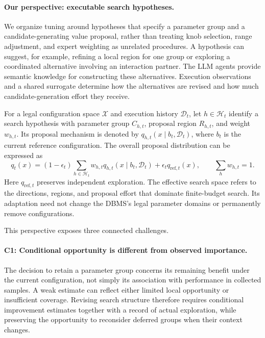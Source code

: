 \paragraph{Our perspective: executable search hypotheses.}
We organize tuning around hypotheses that specify a parameter group and a candidate-generating value proposal, rather than treating knob selection, range adjustment, and expert weighting as unrelated procedures. A hypothesis can suggest, for example, refining a local region for one group or exploring a coordinated alternative involving an interaction partner. The LLM agents provide semantic knowledge for constructing these alternatives. Execution observations and a shared surrogate determine how the alternatives are revised and how much candidate-generation effort they receive.

For a legal configuration space $\mathcal X$ and execution history $\mathcal D_t$, let $h\in\mathcal H_t$ identify a search hypothesis with parameter group $C_{h,t}$, proposal region $R_{h,t}$, and weight $w_{h,t}$. Its proposal mechanism is denoted by $q_{h,t}(x\mid b_t,\mathcal D_t)$, where $b_t$ is the current reference configuration. The overall proposal distribution can be expressed as
\begin{equation}
q_t(x)=(1-\epsilon_t)\sum_{h\in\mathcal H_t}w_{h,t}
q_{h,t}(x\mid b_t,\mathcal D_t)+\epsilon_t q_{\mathrm{ref},t}(x),
\qquad \sum_h w_{h,t}=1.
\end{equation}
Here $q_{\mathrm{ref},t}$ preserves independent exploration. The effective search space refers to the directions, regions, and proposal effort that dominate finite-budget search. Its adaptation need not change the DBMS's legal parameter domains or permanently remove configurations.

This perspective exposes three connected challenges.

\paragraph{C1: Conditional opportunity is different from observed importance.}
The decision to retain a parameter group concerns its remaining benefit under the current configuration, not simply its association with performance in collected samples. A weak estimate can reflect either limited local opportunity or insufficient coverage. Revising search structure therefore requires conditional improvement estimates together with a record of actual exploration, while preserving the opportunity to reconsider deferred groups when their context changes.

